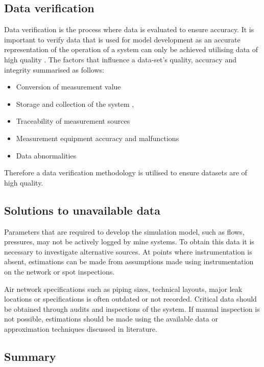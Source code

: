 	\subsection{Data verification}
	Data verification is the process where data is evaluated to ensure accuracy. It is important to verify data that is used for model development as an accurate representation of the operation of a system can only be achieved utilising data of high quality \cite{gous2016data}. The factors that influence a data-set's quality, accuracy and integrity  summarised as follows:
	\begin{itemize}
		\item Conversion of measurement value \cite{meijsen2015verification}
		\item Storage and collection of the system \cite{vanNiekerk2016quantification},\cite{Jansevan2016structuring}
		\item Traceability of measurement sources \cite{Jansevan2016structuring}
		\item Measurement equipment accuracy and malfunctions \cite{gous2016data}
		\item Data abnormalities \cite{gous2016data}
	\end{itemize} 
	\par 
	Therefore a data verification methodology is utilised to ensure datasets are of high quality. 
	\subsection{Solutions to unavailable data}
		Parameters that are required to develop the simulation model, such as flows, pressures, may not be actively logged by mine systems. To obtain this data it is necessary to investigate alternative sources. At points where instrumentation is absent, estimations can be made from assumptions made using instrumentation on the network or spot inspections.
		\par 
		Air network specifications such as piping sizes, technical layouts, major leak locations or specifications is often outdated or not recorded. Critical data should be obtained through audits and inspections of the system. If manual inspection is not possible, estimations should be made using the available data or approximation techniques discussed in literature. %
	
	\subsection{Summary}
		
